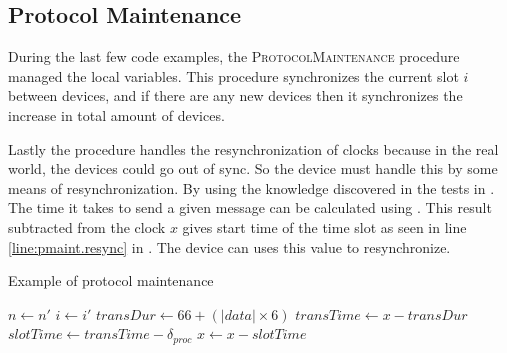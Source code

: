 \subsection{Protocol Maintenance}\label{subsec:protocolmaintanaince}
During the last few code examples, the \textsc{ProtocolMaintenance} procedure managed the local variables. 
This procedure synchronizes the current slot $i$ between devices, and if there are any new devices then it synchronizes the increase in total amount of devices.

Lastly the procedure handles the resynchronization of clocks because in the real world, the devices could go out of sync. 
So the  device must handle this by some means of resynchronization. 
By using the knowledge discovered in the tests in . 
The time it takes to send a given message can be calculated using . 
This result subtracted from the clock $x$ gives start time of the time slot as seen in line \ref{line:pmaint.resync} in . 
The device can uses this value to resynchronize.

\begin{algorithm}[ht]
\caption{Example of protocol maintenance}
\label{lst:maintaniance}
\begin{algorithmic}[1]
        \State $n \gets n'$
    \EndIf
    \State $i \gets i'$
    \State $transDur \gets 66 + (|data| \times 6)$ 
    \State $transTime \gets x - transDur$ 
    \State $slotTime \gets transTime - \delta_{proc}$ 
    \State $x \gets x - slotTime$ \label{line:pmaint.resync}         
\EndProcedure        
\end{algorithmic}    
\end{algorithm} 
